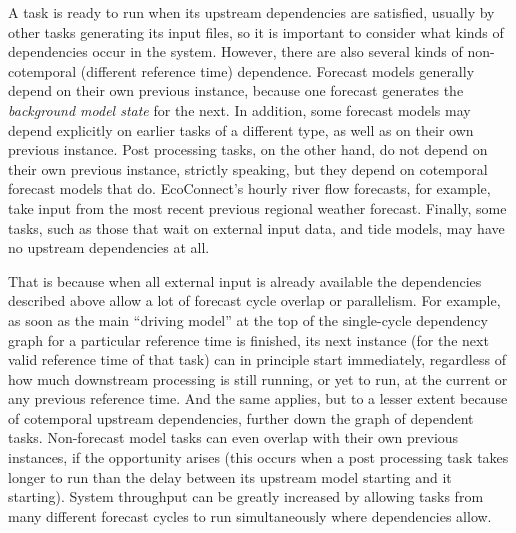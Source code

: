 \documentclass[11pt,a4paper]{article}
\begin{document}
A task is ready to run when its upstream dependencies are satisfied,
usually by other tasks generating its input files, so it is important to
consider what kinds of dependencies occur in the system. 
However, there are also several kinds of non-cotemporal (different
reference time) dependence.  Forecast models generally depend on their
own previous instance, because one forecast generates the {\em
background model state} for the next.  In addition, some forecast models
may depend explicitly on earlier tasks of a different type, as well as
on their own previous instance.  Post processing tasks, on the other
hand, do not depend on their own previous instance, strictly speaking,
but they depend on cotemporal forecast models that do. EcoConnect's
hourly river flow forecasts, for example, take input from the most
recent previous regional weather forecast.  Finally, some tasks, such as
those that wait on external input data, and tide models, may have no
upstream dependencies at all.

That is because when all external input
is already available the dependencies described above allow a lot of
forecast cycle overlap or parallelism.  For example, as soon as the main
``driving model'' at the top of the single-cycle dependency graph for a
particular reference time is finished, its next instance (for the next
valid reference time of that task) can in principle start immediately,
regardless of how much downstream processing is still running, or yet to
run, at the current or any previous reference time.  And the same
applies, but to a lesser extent because of cotemporal upstream
dependencies, further down the graph of dependent tasks. Non-forecast
model tasks can even overlap with their own previous instances, if the
opportunity arises (this occurs when a post processing task takes longer
to run than the delay between its upstream model starting and it
starting).  System throughput can be greatly increased by allowing tasks
from many different forecast cycles to run simultaneously where
dependencies allow.
\end{document}
